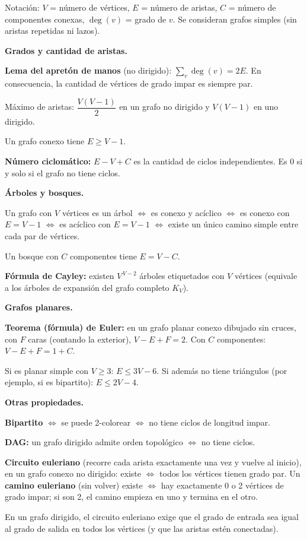 Notación: \(V\) = número de vértices, \(E\) = número de aristas, \(C\) = número de componentes conexas, \(\deg(v)\) = grado de \(v\). Se consideran grafos simples (sin aristas repetidas ni lazos).

\textbf{Grados y cantidad de aristas.}
\begin{props}
  \item \textbf{Lema del apretón de manos} (no dirigido): \(\sum_v \deg(v) = 2E\). En consecuencia, la cantidad de vértices de grado impar es siempre par.
  \item Máximo de aristas: \(\dfrac{V(V-1)}{2}\) en un grafo no dirigido y \(V(V-1)\) en uno dirigido.
  \item Un grafo conexo tiene \(E \ge V - 1\).
  \item \textbf{Número ciclomático:} \(E - V + C\) es la cantidad de ciclos independientes. Es 0 si y solo si el grafo no tiene ciclos.
\end{props}

\textbf{Árboles y bosques.}
\begin{props}
  \item Un grafo con \(V\) vértices es un árbol \(\iff\) es conexo y acíclico \(\iff\) es conexo con \(E = V-1\) \(\iff\) es acíclico con \(E = V-1\) \(\iff\) existe un único camino simple entre cada par de vértices.
  \item Un bosque con \(C\) componentes tiene \(E = V - C\).
  \item \textbf{Fórmula de Cayley:} existen \(V^{\,V-2}\) árboles etiquetados con \(V\) vértices (equivale a los árboles de expansión del grafo completo \(K_V\)).
\end{props}

\textbf{Grafos planares.}
\begin{props}
  \item \textbf{Teorema (fórmula) de Euler:} en un grafo planar conexo dibujado sin cruces, con \(F\) caras (contando la exterior), \(V - E + F = 2\). Con \(C\) componentes: \(V - E + F = 1 + C\).
  \item Si es planar simple con \(V \ge 3\): \(E \le 3V - 6\). Si además no tiene triángulos (por ejemplo, si es bipartito): \(E \le 2V - 4\).
\end{props}

\textbf{Otras propiedades.}
\begin{props}
  \item \textbf{Bipartito} \(\iff\) se puede 2-colorear \(\iff\) no tiene ciclos de longitud impar.
  \item \textbf{DAG:} un grafo dirigido admite orden topológico \(\iff\) no tiene ciclos.
  \item \textbf{Circuito euleriano} (recorre cada arista exactamente una vez y vuelve al inicio), en un grafo conexo no dirigido: existe \(\iff\) todos los vértices tienen grado par. Un \textbf{camino euleriano} (sin volver) existe \(\iff\) hay exactamente 0 o 2 vértices de grado impar; si son 2, el camino empieza en uno y termina en el otro.
  \item En un grafo dirigido, el circuito euleriano exige que el grado de entrada sea igual al grado de salida en todos los vértices (y que las aristas estén conectadas).
\end{props}
